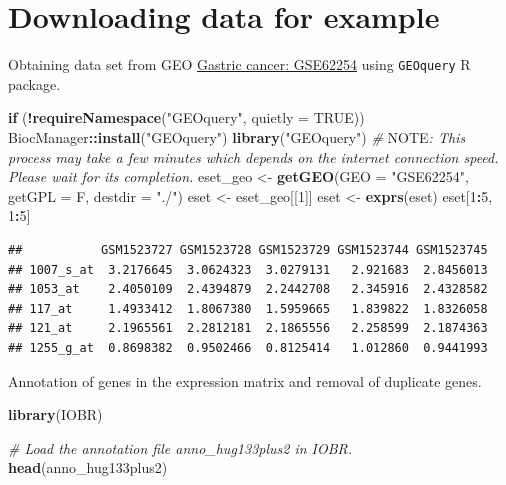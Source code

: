\documentclass[
  12pt,
]{book}
\newenvironment{Shaded}{\begin{snugshade}}{\end{snugshade}}
\newcommand{\AlertTok}[1]{\textcolor[rgb]{0.94,0.16,0.16}{#1}}
\newcommand{\AttributeTok}[1]{\textcolor[rgb]{0.13,0.29,0.53}{#1}}
\newcommand{\CommentTok}[1]{\textcolor[rgb]{0.56,0.35,0.01}{\textit{#1}}}
\newcommand{\ConstantTok}[1]{\textcolor[rgb]{0.56,0.35,0.01}{#1}}
\newcommand{\ControlFlowTok}[1]{\textcolor[rgb]{0.13,0.29,0.53}{\textbf{#1}}}
\newcommand{\DecValTok}[1]{\textcolor[rgb]{0.00,0.00,0.81}{#1}}
\newcommand{\FunctionTok}[1]{\textcolor[rgb]{0.13,0.29,0.53}{\textbf{#1}}}
\newcommand{\NormalTok}[1]{#1}
\newcommand{\OtherTok}[1]{\textcolor[rgb]{0.56,0.35,0.01}{#1}}
\newcommand{\SpecialCharTok}[1]{\textcolor[rgb]{0.81,0.36,0.00}{\textbf{#1}}}
\newcommand{\StringTok}[1]{\textcolor[rgb]{0.31,0.60,0.02}{#1}}
\begin{document}
\hypertarget{downloading-data-for-example-1}{%
\section{Downloading data for example}\label{downloading-data-for-example-1}}

Obtaining data set from GEO \href{https://pubmed.ncbi.nlm.nih.gov/25894828/}{Gastric cancer: GSE62254} using \texttt{GEOquery} R package.

\begin{Shaded}
\begin{Highlighting}[]
\ControlFlowTok{if}\NormalTok{ (}\SpecialCharTok{!}\FunctionTok{requireNamespace}\NormalTok{(}\StringTok{"GEOquery"}\NormalTok{, }\AttributeTok{quietly =} \ConstantTok{TRUE}\NormalTok{))  BiocManager}\SpecialCharTok{::}\FunctionTok{install}\NormalTok{(}\StringTok{"GEOquery"}\NormalTok{)}
\FunctionTok{library}\NormalTok{(}\StringTok{"GEOquery"}\NormalTok{)}
\CommentTok{\# }\AlertTok{NOTE}\CommentTok{: This process may take a few minutes which depends on the internet connection speed. Please wait for its completion.}
\NormalTok{eset\_geo }\OtherTok{\textless{}{-}} \FunctionTok{getGEO}\NormalTok{(}\AttributeTok{GEO =} \StringTok{"GSE62254"}\NormalTok{, }\AttributeTok{getGPL  =}\NormalTok{ F, }\AttributeTok{destdir =} \StringTok{"./"}\NormalTok{)}
\NormalTok{eset    }\OtherTok{\textless{}{-}}\NormalTok{ eset\_geo[[}\DecValTok{1}\NormalTok{]]}
\NormalTok{eset    }\OtherTok{\textless{}{-}} \FunctionTok{exprs}\NormalTok{(eset)}
\NormalTok{eset[}\DecValTok{1}\SpecialCharTok{:}\DecValTok{5}\NormalTok{, }\DecValTok{1}\SpecialCharTok{:}\DecValTok{5}\NormalTok{]}
\end{Highlighting}
\end{Shaded}

\begin{verbatim}
##           GSM1523727 GSM1523728 GSM1523729 GSM1523744 GSM1523745
## 1007_s_at  3.2176645  3.0624323  3.0279131   2.921683  2.8456013
## 1053_at    2.4050109  2.4394879  2.2442708   2.345916  2.4328582
## 117_at     1.4933412  1.8067380  1.5959665   1.839822  1.8326058
## 121_at     2.1965561  2.2812181  2.1865556   2.258599  2.1874363
## 1255_g_at  0.8698382  0.9502466  0.8125414   1.012860  0.9441993
\end{verbatim}

Annotation of genes in the expression matrix and removal of duplicate genes.

\begin{Shaded}
\begin{Highlighting}[]
\FunctionTok{library}\NormalTok{(IOBR)}

\CommentTok{\# Load the annotation file \textasciigrave{}anno\_hug133plus2\textasciigrave{} in IOBR.}
\FunctionTok{head}\NormalTok{(anno\_hug133plus2)}
\end{Highlighting}
\end{Shaded}
\end{document}
